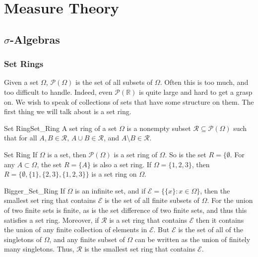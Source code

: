     \chapter{Measure Theory}
        \section{\texorpdfstring{$\sigma$}{Sigma}-Algebras}
            \subsection{Set Rings}
                Given a set $\Omega$, $\mathcal{P}(\Omega)$ is the
                set of all subsets of $\Omega$. Often this is too
                much, and too difficult to handle. Indeed, even
                $\mathcal{P}(\mathbb{R})$ is quite large and hard
                to get a grasp on. We wish to speak of collections
                of sets that have some structure on them.
                The first thing we will talk about is a set ring.
                \begin{ldefinition}{Set Ring}{Set_Ring}
                    A set ring of a set $\Omega$ is a nonempty subset
                    $\mathcal{R}\subseteq\mathcal{P}(\Omega)$ such
                    that for all
                    $A,B\in\mathcal{R}$, $A\cup{B}\in\mathcal{R}$,
                    and $A\setminus{B}\in\mathcal{R}$.
                \end{ldefinition}
                \begin{lexample}{}{Set Ring}
                    If $\Omega$ is a set, then
                    $\mathcal{P}(\Omega)$ is a set ring of
                    $\Omega$. So is the set $R=\{\emptyset$.
                    For any $A\subset\Omega$, the set
                    $R=\{A\}$ is also a set ring. If
                    $\Omega=\{1,2,3\}$, then
                    $R=\{\emptyset,\{1\},\{2,3\},\{1,2,3\}\}$ is
                    a set ring on $\Omega$.
                \end{lexample}
                \begin{lexample}{}{Bigger_Set_Ring}
                    If $\Omega$ is an infinite set, and if
                    $\mathcal{E}=\big\{\{x\}:x\in\Omega\big\}$, then the
                    smallest set ring that contains $\mathcal{E}$ is the set of
                    all finite subsets of $\Omega$. For the union of two finite
                    sets is finite, as is the set difference of two finite sets,
                    and thus this satisfies a set ring. Moreover, if $\mathcal{R}$
                    is a set ring that contains $\mathcal{E}$ then it contains the
                    union of any finite collection of elements in $\mathcal{E}$.
                    But $\mathcal{E}$ is the set of all of the singletons of
                    $\Omega$, and any finite subset of $\Omega$ can be written
                    as the union of finitely many singletons. Thus, $\mathcal{R}$
                    is the smallest set ring that contains $\mathcal{E}$.
                \end{lexample}
